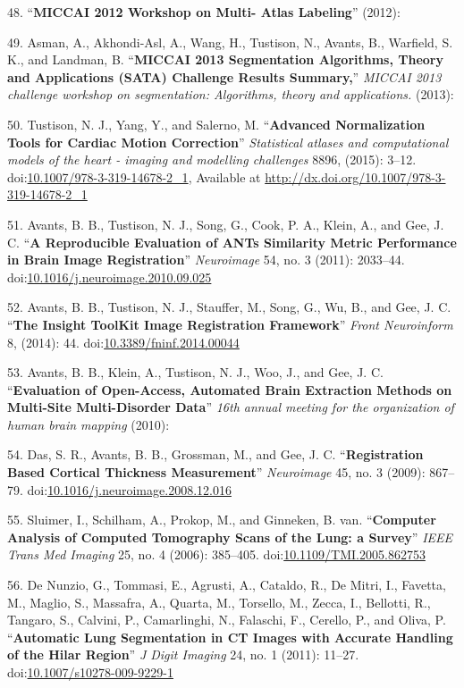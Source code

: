 \documentclass[11pt,]{article}
\begin{document}
48. ``\textbf{MICCAI 2012 Workshop on Multi- Atlas Labeling}'' (2012):

49. Asman, A., Akhondi-Asl, A., Wang, H., Tustison, N., Avants, B.,
Warfield, S. K., and Landman, B. ``\textbf{MICCAI 2013 Segmentation
Algorithms, Theory and Applications (SATA) Challenge Results Summary,}''
\emph{MICCAI 2013 challenge workshop on segmentation: Algorithms, theory
and applications.} (2013):

50. Tustison, N. J., Yang, Y., and Salerno, M. ``\textbf{Advanced
Normalization Tools for Cardiac Motion Correction}'' \emph{Statistical
atlases and computational models of the heart - imaging and modelling
challenges} 8896, (2015): 3--12.
doi:\href{http://dx.doi.org/10.1007/978-3-319-14678-2_1}{10.1007/978-3-319-14678-2\_1},
Available at \url{http://dx.doi.org/10.1007/978-3-319-14678-2_1}

51. Avants, B. B., Tustison, N. J., Song, G., Cook, P. A., Klein, A.,
and Gee, J. C. ``\textbf{A Reproducible Evaluation of ANTs Similarity
Metric Performance in Brain Image Registration}'' \emph{Neuroimage} 54,
no. 3 (2011): 2033--44.
doi:\href{http://dx.doi.org/10.1016/j.neuroimage.2010.09.025}{10.1016/j.neuroimage.2010.09.025}

52. Avants, B. B., Tustison, N. J., Stauffer, M., Song, G., Wu, B., and
Gee, J. C. ``\textbf{The Insight ToolKit Image Registration Framework}''
\emph{Front Neuroinform} 8, (2014): 44.
doi:\href{http://dx.doi.org/10.3389/fninf.2014.00044}{10.3389/fninf.2014.00044}

53. Avants, B. B., Klein, A., Tustison, N. J., Woo, J., and Gee, J. C.
``\textbf{Evaluation of Open-Access, Automated Brain Extraction Methods
on Multi-Site Multi-Disorder Data}'' \emph{16th annual meeting for the
organization of human brain mapping} (2010):

54. Das, S. R., Avants, B. B., Grossman, M., and Gee, J. C.
``\textbf{Registration Based Cortical Thickness Measurement}''
\emph{Neuroimage} 45, no. 3 (2009): 867--79.
doi:\href{http://dx.doi.org/10.1016/j.neuroimage.2008.12.016}{10.1016/j.neuroimage.2008.12.016}

55. Sluimer, I., Schilham, A., Prokop, M., and Ginneken, B. van.
``\textbf{Computer Analysis of Computed Tomography Scans of the Lung: a
Survey}'' \emph{IEEE Trans Med Imaging} 25, no. 4 (2006): 385--405.
doi:\href{http://dx.doi.org/10.1109/TMI.2005.862753}{10.1109/TMI.2005.862753}

56. De Nunzio, G., Tommasi, E., Agrusti, A., Cataldo, R., De Mitri, I.,
Favetta, M., Maglio, S., Massafra, A., Quarta, M., Torsello, M., Zecca,
I., Bellotti, R., Tangaro, S., Calvini, P., Camarlinghi, N., Falaschi,
F., Cerello, P., and Oliva, P. ``\textbf{Automatic Lung Segmentation in
CT Images with Accurate Handling of the Hilar Region}'' \emph{J Digit
Imaging} 24, no. 1 (2011): 11--27.
doi:\href{http://dx.doi.org/10.1007/s10278-009-9229-1}{10.1007/s10278-009-9229-1}
\end{document}
